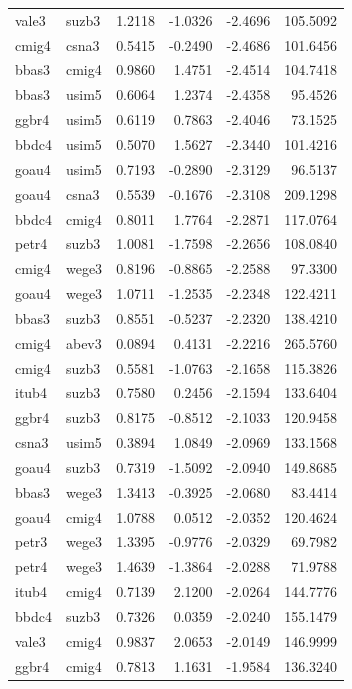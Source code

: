\begin{tabular}{llrrrr}
vale3 & suzb3 & 1.2118 & -1.0326 & -2.4696 & 105.5092\\
cmig4 & csna3 & 0.5415 & -0.2490 & -2.4686 & 101.6456\\
bbas3 & cmig4 & 0.9860 & 1.4751 & -2.4514 & 104.7418\\
\addlinespace
bbas3 & usim5 & 0.6064 & 1.2374 & -2.4358 & 95.4526\\
ggbr4 & usim5 & 0.6119 & 0.7863 & -2.4046 & 73.1525\\
bbdc4 & usim5 & 0.5070 & 1.5627 & -2.3440 & 101.4216\\
goau4 & usim5 & 0.7193 & -0.2890 & -2.3129 & 96.5137\\
goau4 & csna3 & 0.5539 & -0.1676 & -2.3108 & 209.1298\\
\addlinespace
bbdc4 & cmig4 & 0.8011 & 1.7764 & -2.2871 & 117.0764\\
petr4 & suzb3 & 1.0081 & -1.7598 & -2.2656 & 108.0840\\
cmig4 & wege3 & 0.8196 & -0.8865 & -2.2588 & 97.3300\\
goau4 & wege3 & 1.0711 & -1.2535 & -2.2348 & 122.4211\\
bbas3 & suzb3 & 0.8551 & -0.5237 & -2.2320 & 138.4210\\
\addlinespace
cmig4 & abev3 & 0.0894 & 0.4131 & -2.2216 & 265.5760\\
cmig4 & suzb3 & 0.5581 & -1.0763 & -2.1658 & 115.3826\\
itub4 & suzb3 & 0.7580 & 0.2456 & -2.1594 & 133.6404\\
ggbr4 & suzb3 & 0.8175 & -0.8512 & -2.1033 & 120.9458\\
csna3 & usim5 & 0.3894 & 1.0849 & -2.0969 & 133.1568\\
\addlinespace
goau4 & suzb3 & 0.7319 & -1.5092 & -2.0940 & 149.8685\\
bbas3 & wege3 & 1.3413 & -0.3925 & -2.0680 & 83.4414\\
goau4 & cmig4 & 1.0788 & 0.0512 & -2.0352 & 120.4624\\
petr3 & wege3 & 1.3395 & -0.9776 & -2.0329 & 69.7982\\
petr4 & wege3 & 1.4639 & -1.3864 & -2.0288 & 71.9788\\
\addlinespace
itub4 & cmig4 & 0.7139 & 2.1200 & -2.0264 & 144.7776\\
bbdc4 & suzb3 & 0.7326 & 0.0359 & -2.0240 & 155.1479\\
vale3 & cmig4 & 0.9837 & 2.0653 & -2.0149 & 146.9999\\
ggbr4 & cmig4 & 0.7813 & 1.1631 & -1.9584 & 136.3240\\

\end{tabular}

